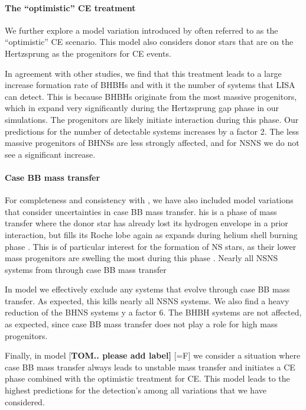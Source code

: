 \paragraph{The ``optimistic'' CE treatment} We further explore a model variation introduced by \citet{Belczynski+2007} often referred to as the ``optimistic'' CE scenario. This model also considers donor stars that are on the Hertzsprung as the progenitors for CE events.  

In agreement with other studies, we find that this treatment leads to a large increase formation rate of BHBHs and with it the number of systems that LISA can detect. This is because BHBHs originate from the most massive progenitors, which in expand very significantly during the Hertzsprung gap phase in our simulations. The progenitors are likely initiate interaction during this phase. Our predictions for the number of detectable systems increases by a factor 2. The less massive progenitors of BHNSs are less strongly affected, and for NSNS we do not see a significant increase. 

\paragraph{Case BB mass transfer} For completeness and consistency with \citet{Broekgaarden+2021}, we have also included model variations that consider uncertainties in case BB mass transfer. his is a phase of mass transfer where the donor star has already lost its hydrogen envelope in a prior interaction, but fills its Roche lobe again as expands during helium shell burning phase \citep[e.g.][]{Dewi+2003, Vigna-Gomez+2018}. This is of particular interest for the formation of NS stars, as their lower mass progenitors are swelling the most during this phase \citet[e.g.][and references therein]{Laplace+2020}. Nearly all NSNS systems from through case BB mass transfer

In model \modCaseBB{} we effectively exclude any systems that evolve through case BB mass transfer. As expected, this kills nearly all NSNS systems. We also find a heavy reduction of the BHNS systems y a factor 6. The BHBH systems are not affected, as expected, since case BB mass transfer does not play a role for high mass progenitors.  

Finally, in model {[\bf TOM.. please add label]} [=F] we consider a situation where case BB mass transfer always leads to unstable mass transfer and initiates a CE phase combined with the optimistic treatment for CE. This model leads to the highest predictions for the detection's among all variations that we have considered. 

